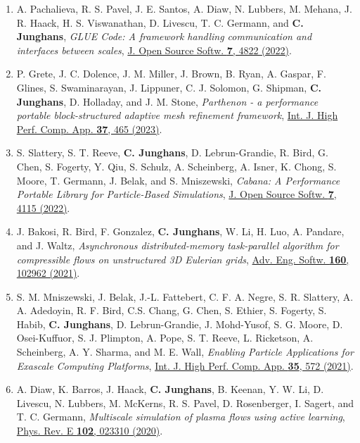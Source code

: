 \documentclass{article}
\begin{document}
\begin{enumerate}
\item[39.] A. Pachalieva, R. S. Pavel, J. E. Santos, A. Diaw, N. Lubbers, M. Mehana, J. R. Haack, H. S. Viswanathan, D. Livescu, T. C. Germann, and \textbf{C. Junghans},
   \textit{GLUE Code: A framework handling communication and interfaces between scales},
   \href{https://doi.org/10.21105/joss.04822}{J. Open Source Softw. \textbf{7}, 4822 (2022)}.

\item[38.] P. Grete, J. C. Dolence, J. M. Miller, J. Brown, B. Ryan, A. Gaspar, F. Glines, S. Swaminarayan, J. Lippuner, C. J. Solomon, G. Shipman, \textbf{C. Junghans}, D. Holladay, and J. M. Stone,
   \textit{Parthenon - a performance portable block-structured adaptive mesh refinement framework},
   \href{https://doi.org/10.1177/10943420221143775}{Int. J. High Perf. Comp. App. \textbf{37}, 465 (2023)}.

\item[37.] S. Slattery, S. T. Reeve, \textbf{C. Junghans}, D. Lebrun-Grandie, R. Bird, G. Chen, S. Fogerty, Y. Qiu, S. Schulz, A. Scheinberg, A. Isner, K. Chong, S. Moore, T. Germann, J. Belak, and S. Mniszewski,
   \textit{Cabana: A Performance Portable Library for Particle-Based Simulations},
   \href{https://doi.org/10.21105/joss.04115}{J. Open Source Softw. \textbf{7}, 4115 (2022)}.

\item[36.] J. Bakosi, R. Bird, F. Gonzalez, \textbf{C. Junghans}, W. Li, H. Luo, A. Pandare, and J. Waltz,
  \textit{Asynchronous distributed-memory task-parallel algorithm for compressible flows on unstructured 3D Eulerian grids},
  \href{https://doi.org/10.1016/j.advengsoft.2020.102962}{Adv. Eng. Softw. \textbf{160}, 102962 (2021)}.

\item[35.] S. M. Mniszewski, J. Belak, J.-L. Fattebert, C. F. A. Negre, S. R. Slattery, A. A. Adedoyin, R. F. Bird, C.S. Chang, G. Chen, S. Ethier, S. Fogerty, S. Habib, \textbf{C. Junghans}, D. Lebrun-Grandie, J. Mohd-Yusof, S. G. Moore, D. Osei-Kuffuor, S. J. Plimpton, A. Pope, S. T. Reeve, L. Ricketson, A. Scheinberg, A. Y. Sharma, and M. E. Wall,
  \textit{Enabling Particle Applications for Exascale Computing Platforms},
  \href{https://doi.org/10.1177/10943420211022829}{Int. J. High Perf. Comp. App. \textbf{35}, 572 (2021)}.

\item[34.] A. Diaw, K. Barros, J. Haack, \textbf{C. Junghans}, B. Keenan, Y. W. Li, D. Livescu, N. Lubbers, M. McKerns, R. S. Pavel, D. Rosenberger, I. Sagert, and T. C. Germann, 
  \textit{Multiscale simulation of plasma flows using active learning},
  \href{https://doi.org/10.1103/PhysRevE.102.023310}{Phys. Rev. E \textbf{102}, 023310 (2020)}.


\end{enumerate}
\end{document}
